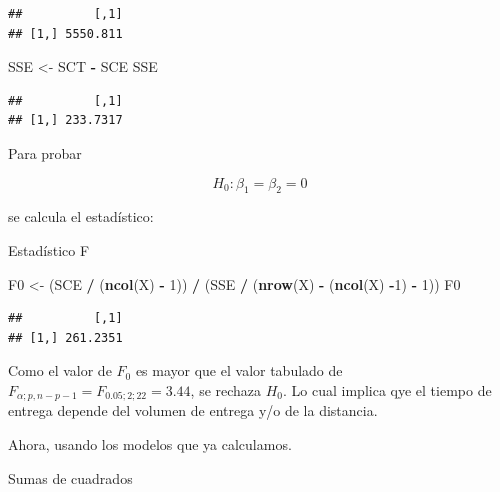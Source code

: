 \documentclass[
]{book}
\newenvironment{Shaded}{\begin{snugshade}}{\end{snugshade}}
\newcommand{\DecValTok}[1]{\textcolor[rgb]{0.00,0.00,0.81}{#1}}
\newcommand{\FunctionTok}[1]{\textcolor[rgb]{0.13,0.29,0.53}{\textbf{#1}}}
\newcommand{\NormalTok}[1]{#1}
\newcommand{\OtherTok}[1]{\textcolor[rgb]{0.56,0.35,0.01}{#1}}
\newcommand{\SpecialCharTok}[1]{\textcolor[rgb]{0.81,0.36,0.00}{\textbf{#1}}}
\begin{document}
\begin{verbatim}
##          [,1]
## [1,] 5550.811
\end{verbatim}

\begin{Shaded}
\begin{Highlighting}[]
\NormalTok{SSE }\OtherTok{\textless{}{-}}\NormalTok{ SCT }\SpecialCharTok{{-}}\NormalTok{ SCE}
\NormalTok{SSE}
\end{Highlighting}
\end{Shaded}

\begin{verbatim}
##          [,1]
## [1,] 233.7317
\end{verbatim}

Para probar

\[H_0 : \beta_1 = \beta_2=0\]

se calcula el estadístico:

Estadístico F

\begin{Shaded}
\begin{Highlighting}[]
\NormalTok{F0 }\OtherTok{\textless{}{-}}\NormalTok{ (SCE }\SpecialCharTok{/}\NormalTok{ (}\FunctionTok{ncol}\NormalTok{(X) }\SpecialCharTok{{-}} \DecValTok{1}\NormalTok{)) }\SpecialCharTok{/}\NormalTok{ (SSE }\SpecialCharTok{/}\NormalTok{ (}\FunctionTok{nrow}\NormalTok{(X) }\SpecialCharTok{{-}}\NormalTok{ (}\FunctionTok{ncol}\NormalTok{(X) }\SpecialCharTok{{-}}\DecValTok{1}\NormalTok{) }\SpecialCharTok{{-}} \DecValTok{1}\NormalTok{))}
\NormalTok{F0}
\end{Highlighting}
\end{Shaded}

\begin{verbatim}
##          [,1]
## [1,] 261.2351
\end{verbatim}

Como el valor de \(F_0\) es mayor que el valor tabulado de \(F_{\alpha;p,n-p-1}=F_{0.05;2;22}=3.44\), se rechaza \(H_0\). Lo cual implica qye el tiempo de entrega depende del volumen de entrega y/o de la distancia.

Ahora, usando los modelos que ya calculamos.

Sumas de cuadrados

\begin{Shaded}
\end{Shaded}
\end{document}
